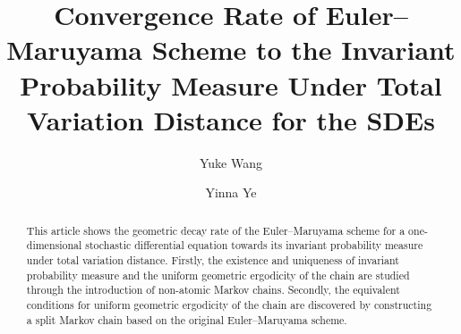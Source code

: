 \documentclass[11pt]{elsarticle}
\begin{document}
	\let\today\relax
\date{\quad}
\begin{frontmatter}



\title{Convergence Rate of Euler--Maruyama Scheme to the Invariant Probability Measure Under Total Variation Distance for the SDEs}
\author[cor1]{Yuke Wang}
\author[cor2]{Yinna Ye}

\address[cor1]{{School of Mathematics and Statistics, Northeastern University at Qinhuangdao, Qinhuangdao 066004, China}}	
\address[cor2]{Department of Applied Mathematics, School of Mathematics and Physics, Xi'an Jiaotong-Liverpool University, Suzhou 215123, China}	



\begin{abstract}
This article shows the geometric decay rate of the Euler--Maruyama scheme for a one-dimensional stochastic differential equation towards its invariant probability measure under total variation distance. Firstly, the existence and uniqueness of invariant probability measure and the uniform geometric ergodicity of the chain are studied through the introduction of non-atomic Markov chains. Secondly, the equivalent conditions for uniform geometric ergodicity of the chain are discovered by constructing a split Markov chain based on the original Euler--Maruyama scheme.
\end{abstract}



\end{frontmatter}
\end{document}
